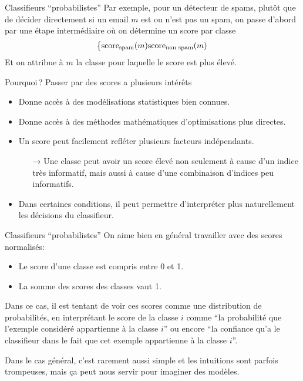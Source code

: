 \documentclass[../allslides.tex]{subfiles}
\begin{document}
\begin{frame}{Classifieurs \enquote{probabilistes}}
	Par exemple, pour un détecteur de spams, plutôt que de décider directement si un email \(m\) est ou n'est pas un spam, on passe d'abord par une étape intermédiaire où on détermine un score par classe
	\begin{equation}
		\begin{dcases*}
			\text{score}_{\text{spam}}(m)
			\text{score}_{\text{non spam}}(m)
		\end{dcases*}
	\end{equation}
	Et on attribue à \(m\) la classe pour laquelle le score est plus élevé.
\end{frame}

\begin{frame}{Pourquoi ?}
	Passer par des scores a plusieurs intérêts

	\begin{itemize}
		\item Donne accès à des \alert{modélisations statistiques} bien connues.
		\item Donne accès à des \alert{méthodes mathématiques} d'optimisations plus directes.
		\item Un score peut facilement refléter plusieurs \alert{facteurs indépendants}.
			\begin{itemize}
				\item[→] Une classe peut avoir un score élevé non seulement à cause d'un indice très informatif, mais aussi à cause d'une combinaison d'indices peu informatifs.
			\end{itemize}
		\item Dans certaines conditions, il peut permettre d'\alert{interpréter} plus naturellement les décisions du classifieur.
	\end{itemize}
\end{frame}

\begin{frame}{Classifieurs \enquote{probabilistes}}
	On aime bien en général travailler avec des scores \alert{normalisés}:

	\begin{itemize}
		\item Le score d'une classe est compris entre \num{0} et \num{1}.
		\item La somme des scores des classes vaut \num{1}.
	\end{itemize}

	\pause

	Dans ce cas, il est tentant de voir ces scores comme une \alert{distribution de probabilités}, en interprétant le score de la classe \(i\) comme \enquote{la probabilité que l'exemple considéré appartienne à la classe \(i\)} ou encore \enquote{la \alert{confiance} qu'a le classifieur dans le fait que cet exemple appartienne à la classe \(i\)}.

	Dans le cas général, c'est rarement aussi simple et les intuitions sont parfois trompeuses, mais ça peut nous servir pour imaginer des modèles.
\end{frame}
\end{document}
